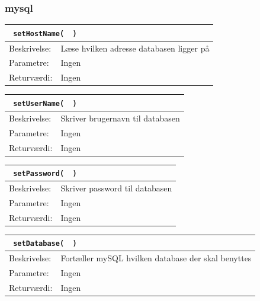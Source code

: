 \subsubsection{mysql}
\begin{table}[H]
\begin{tabular}{l p{12.5cm}}
\multicolumn{2}{l}{\texttt{\textcolor{blue}{} setHostName( \textcolor{blue}{} )}} \\
\hline
Beskrivelse: & Læse hvilken adresse databasen ligger på\\
Parametre: & Ingen\\
Returværdi: & Ingen\\
\end{tabular}
\end{table}

\begin{table}[H]
\begin{tabular}{l p{12.5cm}}
\multicolumn{2}{l}{\texttt{\textcolor{blue}{} setUserName( \textcolor{blue}{} )}} \\
\hline
Beskrivelse: & Skriver brugernavn til databasen\\
Parametre: & Ingen\\
Returværdi: & Ingen\\
\end{tabular}
\end{table}

\begin{table}[H]
\begin{tabular}{l p{12.5cm}}
\multicolumn{2}{l}{\texttt{\textcolor{blue}{} setPassword( \textcolor{blue}{} )}} \\
\hline
Beskrivelse:&Skriver password til databasen\\
Parametre: & Ingen\\
Returværdi: & Ingen\\
\end{tabular}
\end{table}

\begin{table}[H]
\begin{tabular}{l p{12.5cm}}
\multicolumn{2}{l}{\texttt{\textcolor{blue}{} setDatabase( \textcolor{blue}{} )}} \\
\hline
Beskrivelse: & Fortæller mySQL hvilken database der skal benyttes\\
Parametre: & Ingen\\
Returværdi: & Ingen\\
\end{tabular}
\end{table}

